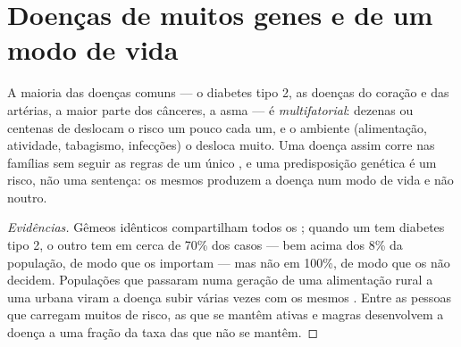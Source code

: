 \section{Doenças de muitos genes e de um modo de vida}

\begin{proposition}\label{prop:g11:genes-and-disease:multifactorial}
A maioria das doenças comuns --- o diabetes tipo 2, as doenças do
coração e das artérias, a maior parte dos cânceres, a asma --- é
\emph{multifatorial}: dezenas ou centenas
de  deslocam o risco um pouco cada um, e o ambiente
(alimentação, atividade, tabagismo, infecções) o desloca muito. Uma
doença assim corre nas famílias sem seguir as regras de um único ,
e uma predisposição genética é um risco, não uma sentença: os mesmos
 produzem a doença num modo de vida e não noutro.
\end{proposition}
\begin{proof}[Evidências]
Gêmeos idênticos compartilham todos os ; quando um tem diabetes
tipo 2, o outro tem em cerca de 70\% dos casos --- bem acima dos 8\% da
população, de modo que os  importam --- mas não em 100\%, de modo
que os  não decidem. Populações que passaram numa geração de uma
alimentação rural a uma urbana viram a doença subir várias vezes com os
mesmos . Entre as pessoas que carregam muitos  de risco, as
que se mantêm ativas e magras desenvolvem a doença a uma fração da taxa
das que não se mantêm.
\end{proof}

